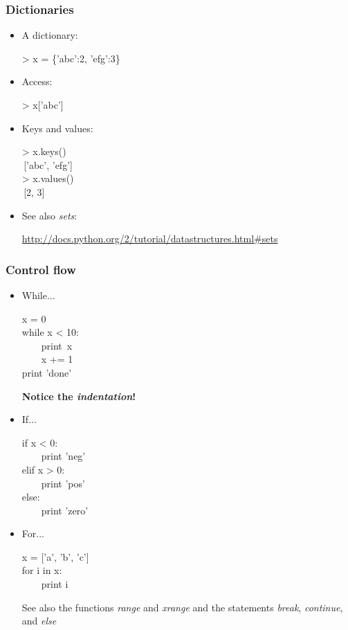 \documentclass{beamer}
\newenvironment{code}{%
  \begin{exampleblock}{}
      \ttfamily
    }{%
  \end{exampleblock}
}
\begin{document}
\begin{frame}
    \frametitle{Dictionaries}
    \begin{itemize}
    \item A dictionary:
        \begin{code}
            > x = \{'abc':2, 'efg':3\}
        \end{code}
    \item Access:
        \begin{code}
            > x['abc']
        \end{code}
    \item Keys and values:
        \begin{code}
            > x.keys()\\
            \,['abc', 'efg']\\
            > x.values()\\
            \,[2, 3]
        \end{code}
    \item See also \emph{sets}:
        \begin{block}{}
            \url{http://docs.python.org/2/tutorial/datastructures.html\#sets}
        \end{block}
    \end{itemize}
\end{frame}

\begin{frame}[allowframebreaks]
    \frametitle{Control flow}
    \begin{itemize}
    \item While...
        \begin{code}
            x = 0\\
            while x < 10:\\
            ~~~~print~x\\
            ~~~~x += 1\\
            print 'done'
        \end{code}
        \textbf{Notice the \emph{indentation}!}
    \item If...
        \begin{code}
            if x < 0:\\
            ~~~~print 'neg'\\
            elif x > 0:\\
            ~~~~print 'pos'\\
            else:\\
            ~~~~print 'zero'
        \end{code}
    \item For...
        \begin{code}
            x = ['a', 'b', 'c']\\
            for i in x:\\
            ~~~~print i
        \end{code}
        See also the functions \emph{range} and \emph{xrange} and the
        statements \emph{break}, \emph{continue}, and \emph{else}
    \end{itemize}
\end{frame}
\end{document}
